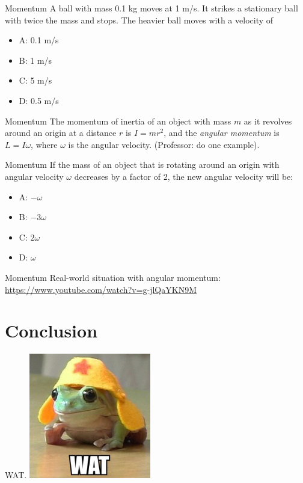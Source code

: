 \documentclass{beamer}
\begin{document}
\begin{frame}{Momentum}
A ball with mass 0.1 kg moves at 1 m/s.  It strikes a stationary ball with twice the mass and stops.  The heavier ball moves with a velocity of
\begin{itemize}
\item A: 0.1 m/s
\item B: 1 m/s
\item C: 5 m/s
\item D: 0.5 m/s
\end{itemize}
\end{frame}

\begin{frame}{Momentum}
The momentum of inertia of an object with mass $m$ as it revolves around an origin at a distance $r$ is $I = mr^2$, and the \textit{angular momentum} is $L = I \omega$, where $\omega$ is the angular velocity. (Professor: do one example).
\end{frame}

\begin{frame}{Momentum}
If the mass of an object that is rotating around an origin with angular velocity $\omega$ decreases by a factor of 2, the new angular velocity will be:
\begin{itemize}
\item A: $-\omega$
\item B: $-3\omega$
\item C: $2\omega$
\item D: $\omega$
\end{itemize}
\end{frame}

\begin{frame}{Momentum}
Real-world situation with angular momentum: \\
\url{https://www.youtube.com/watch?v=g-jlQaYKN9M}
\end{frame}

\section{Conclusion}

\begin{frame}{WAT.}
\centering
\includegraphics[width=0.4\textwidth]{figures/frogs-know-wats.png}
\end{frame}
\end{document}
